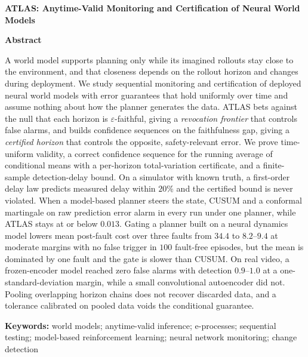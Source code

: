 \documentclass[12pt,a4paper]{article}
\begin{document}
{\large\bfseries ATLAS: Anytime-Valid Monitoring and Certification of Neural World Models}

\textbf{Abstract}

A world model supports planning only while its imagined rollouts stay close to the environment, and that closeness depends on the rollout horizon and changes during deployment. We study sequential monitoring and certification of deployed neural world models with error guarantees that hold uniformly over time and assume nothing about how the planner generates the data. ATLAS bets against the null that each horizon is $\varepsilon$-faithful, giving a \emph{revocation frontier} that controls false alarms, and builds confidence sequences on the faithfulness gap, giving a \emph{certified horizon} that controls the opposite, safety-relevant error. We prove time-uniform validity, a correct confidence sequence for the running average of conditional means with a per-horizon total-variation certificate, and a finite-sample detection-delay bound. On a simulator with known truth, a first-order delay law predicts measured delay within $20\%$ and the certified bound is never violated. When a model-based planner steers the state, CUSUM and a conformal martingale on raw prediction error alarm in every run under one planner, while ATLAS stays at or below $0.013$. Gating a planner built on a neural dynamics model lowers mean post-fault cost over three faults from $34.4$ to $8.2$--$9.4$ at moderate margins with no false trigger in $100$ fault-free episodes, but the mean is dominated by one fault and the gate is slower than CUSUM. On real video, a frozen-encoder model reached zero false alarms with detection $0.9$--$1.0$ at a one-standard-deviation margin, while a small convolutional autoencoder did not. Pooling overlapping horizon chains does not recover discarded data, and a tolerance calibrated on pooled data voids the conditional guarantee.

\textbf{Keywords:} world models; anytime-valid inference; e-processes; sequential testing; model-based reinforcement learning; neural network monitoring; change detection
\end{document}

